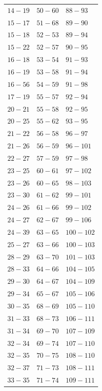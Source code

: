 \documentclass[11pt]{article}
\begin{document}
\begin{center}
\begin{longtable}{@{}lll@{}}
$14\!\!-\!\!19$ & $50\!\!-\!\!60$ & $88\!\!-\!\!93$ \\
$15\!\!-\!\!17$ & $51\!\!-\!\!68$ & $89\!\!-\!\!90$ \\
$15\!\!-\!\!18$ & $52\!\!-\!\!53$ & $89\!\!-\!\!94$ \\
$15\!\!-\!\!22$ & $52\!\!-\!\!57$ & $90\!\!-\!\!95$ \\
$16\!\!-\!\!18$ & $53\!\!-\!\!54$ & $91\!\!-\!\!93$ \\
$16\!\!-\!\!19$ & $53\!\!-\!\!58$ & $91\!\!-\!\!94$ \\
$16\!\!-\!\!56$ & $54\!\!-\!\!59$ & $91\!\!-\!\!98$ \\
$17\!\!-\!\!19$ & $55\!\!-\!\!57$ & $92\!\!-\!\!94$ \\
$20\!\!-\!\!21$ & $55\!\!-\!\!58$ & $92\!\!-\!\!95$ \\
$20\!\!-\!\!25$ & $55\!\!-\!\!62$ & $93\!\!-\!\!95$ \\
$21\!\!-\!\!22$ & $56\!\!-\!\!58$ & $96\!\!-\!\!97$ \\
$21\!\!-\!\!26$ & $56\!\!-\!\!59$ & $96\!\!-\!\!101$ \\
$22\!\!-\!\!27$ & $57\!\!-\!\!59$ & $97\!\!-\!\!98$ \\
$23\!\!-\!\!25$ & $60\!\!-\!\!61$ & $97\!\!-\!\!102$ \\
$23\!\!-\!\!26$ & $60\!\!-\!\!65$ & $98\!\!-\!\!103$ \\
$23\!\!-\!\!30$ & $61\!\!-\!\!62$ & $99\!\!-\!\!101$ \\
$24\!\!-\!\!26$ & $61\!\!-\!\!66$ & $99\!\!-\!\!102$ \\
$24\!\!-\!\!27$ & $62\!\!-\!\!67$ & $99\!\!-\!\!106$ \\
$24\!\!-\!\!39$ & $63\!\!-\!\!65$ & $100\!\!-\!\!102$ \\
$25\!\!-\!\!27$ & $63\!\!-\!\!66$ & $100\!\!-\!\!103$ \\
$28\!\!-\!\!29$ & $63\!\!-\!\!70$ & $101\!\!-\!\!103$ \\
$28\!\!-\!\!33$ & $64\!\!-\!\!66$ & $104\!\!-\!\!105$ \\
$29\!\!-\!\!30$ & $64\!\!-\!\!67$ & $104\!\!-\!\!109$ \\
$29\!\!-\!\!34$ & $65\!\!-\!\!67$ & $105\!\!-\!\!106$ \\
$30\!\!-\!\!35$ & $68\!\!-\!\!69$ & $105\!\!-\!\!110$ \\
$31\!\!-\!\!33$ & $68\!\!-\!\!73$ & $106\!\!-\!\!111$ \\
$31\!\!-\!\!34$ & $69\!\!-\!\!70$ & $107\!\!-\!\!109$ \\
$32\!\!-\!\!34$ & $69\!\!-\!\!74$ & $107\!\!-\!\!110$ \\
$32\!\!-\!\!35$ & $70\!\!-\!\!75$ & $108\!\!-\!\!110$ \\
$32\!\!-\!\!37$ & $71\!\!-\!\!73$ & $108\!\!-\!\!111$ \\
$33\!\!-\!\!35$ & $71\!\!-\!\!74$ & $109\!\!-\!\!111$ \\

\end{longtable}
\end{center}
\end{document}
